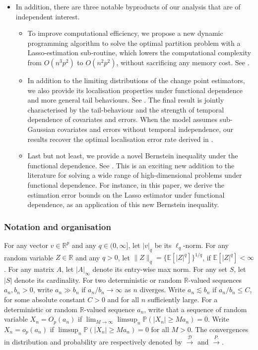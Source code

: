 \documentclass[11pt]{article}
\newcommand{\E}{ { \mathbb{E} } }
\theoremstyle{plain}
\theoremstyle{definition}
\begin{document}
\begin{itemize}
    \item In addition, there are three notable byproducts of our analysis that are of independent interest.  
    \begin{itemize}
        \item To improve computational efficiency, we propose a new dynamic programming algorithm to solve the optimal partition problem \citep[e.g.][]{friedrich2008complexity, killick2012optimal} with a Lasso-estimation sub-routine, which lowers the computational complexity from $O(n^3p^2)$ to $O(n^2p^2)$, without sacrificing any memory cost. See .
        \item In addition to the limiting distributions of the change point estimators, we also provide its localisation properties under functional dependence and more general tail behaviours. See . The final result is jointly characterised by the tail-behaviour and the strength of temporal dependence of covariates and errors.  When the model assumes sub-Gaussian covariates and errors without temporal independence, our results recover the optimal localisation error rate derived in \cite{rinaldo2021localizing}.  
        \item  Last but not least, we provide a novel Bernstein inequality under the functional dependence.  See .  This is an exciting new addition to the literature for solving a wide range of high-dimensional problems under functional dependence.  For instance, in this paper, we derive the estimation error bounds on the Lasso estimator under functional dependence, as an application of this new Bernstein inequality.
    \end{itemize}
\end{itemize}

\subsubsection*{Notation and organisation}

For any vector $v \in \mathbb R^p$ and any $q \in (0, \infty]$, let $|v|_q$ be its $\ell_q$-norm.  For any random variable $Z \in \mathbb{R}$ and any $q > 0$, let $\|Z\|_q= \{ \E[|Z|^q] \}^{1/q}$, if $\E[|Z|^q] < \infty$. For any matrix $A$, let $|A|_{\infty}$ denote its entry-wise max norm. For any set $S$, let $|S|$ denote its cardinality. For two deterministic or random $\mathbb{R}$-valued sequences $a_n, b_n > 0$, write $a_n \gg b_n$ if $a_n/b_n \to \infty$ as $n$ diverges. Write $a_n \lesssim b_n$ if $a_n/b_n \leq C$, for some absolute constant $C>0$ and for all $n$ sufficiently large.  For a deterministic or random $\mathbb{R}$-valued sequence $a_n$, write that a sequence of random variable $X_n = O_p(a_n)$ if $\lim_{M \to \infty}\limsup_{n}\mathbb{P}(|X_n| \geq Ma_n) = 0$.  Write $X_n = o_p(a_n)$ if $\limsup_{n}\mathbb{P}(|X_n| \geq Ma_n) = 0$ for all $M > 0$. The convergences in distribution and probability are respectively denoted by $\overset{\mathcal{D}}{\longrightarrow}$ and $\overset{P.}{\longrightarrow}$. 
\end{document}
